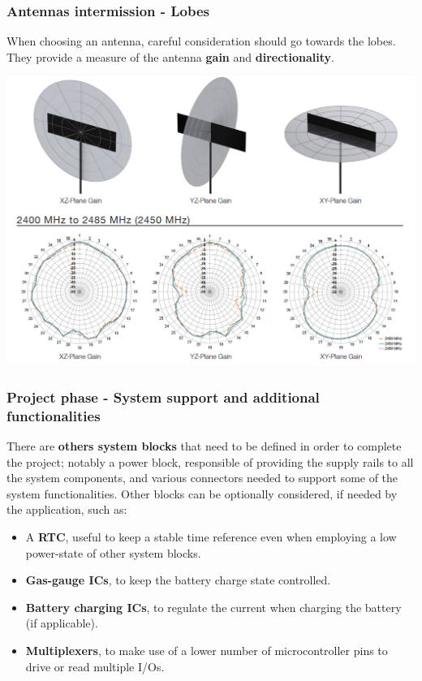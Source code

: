 \documentclass[11pt,xcolor=table,aspectratio=169]{beamer}
\begin{document}
\begin{frame}
\begin{columns}[T]
\begin{column}{.25\textwidth}
\begin{adjustbox}{max height=.3\textheight,max width=.9\textwidth}
				\end{adjustbox}
			\end{column}
		\end{columns}
	\end{frame}

	\begin{frame}
		\frametitle{Antennas intermission - Lobes}
		When choosing an antenna, careful consideration should go towards the lobes. They provide a measure of the antenna \textbf{gain} and \textbf{directionality}.
		\begin{center}
			\begin{adjustbox}{max width=.95\textwidth,max height=.7\textheight}	
				\includegraphics{media/ant_lobes.png}
			\end{adjustbox}
		\end{center}
	\end{frame}

	\begin{frame}
		\frametitle{Project phase - System support and additional functionalities}
		There are \textbf{others system blocks} that need to be defined in order to complete the project; notably a power block, responsible of providing the supply rails to all the system components, and various connectors needed to support some of the system functionalities. Other blocks can be optionally considered, if needed by the application, such as:
		\begin{itemize}
			\item A \textbf{RTC}, useful to keep a stable time reference even when employing a low power-state of other system blocks.
			\item \textbf{Gas-gauge ICs}, to keep the battery charge state controlled.
			\item \textbf{Battery charging ICs}, to regulate the current when charging the battery (if applicable).
			\item \textbf{Multiplexers}, to make use of a lower number of microcontroller pins to drive or read multiple I/Os.
		\end{itemize}
	\end{frame}
\end{document}
